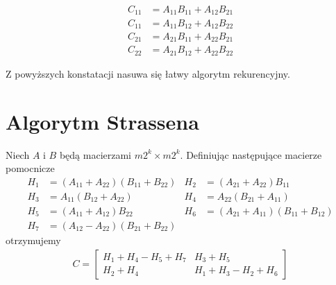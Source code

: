 \begin{equation}
\begin{split}
C_{11} &= A_{11}B_{11} + A_{12}B_{21}\\
C_{11} &= A_{11}B_{12} + A_{12}B_{22}\\
C_{21} &= A_{21}B_{11} + A_{22}B_{21}\\
C_{22} &= A_{21}B_{12} + A_{22}B_{22}
\end{split}
\end{equation}

Z powyższych konstatacji nasuwa się łatwy algorytm rekurencyjny.

\section{Algorytm Strassena}
Niech \(A\) i \(B\) będą macierzami \(m2^k\times m2^k\). Definiując następujące macierze pomocnicze
\begin{align*}
H_1 &= (A_{11}+A_{22})(B_{11}+B_{22})&
 H_2 &= (A_{21}+A_{22})B_{11}\\
H_3 &= A_{11}(B_{12} + A_{22})&
 H_4 &= A_{22}(B_{21} + A_{11})\\
H_5 &= (A_{11}+A_{12})B_{22}&
 H_6 &= (A_{21} + A_{11})(B_{11} + B_{12}) \\
H_7 &= (A_{12}-A_{22})(B_{21}+B_{22}) 
\end{align*}
otrzymujemy
\begin{align}
C = \begin{bmatrix}
H_1+H_4-H_5+H_7& H_3+H_5\\
H_2+H_4& H_1+H_3-H_2+H_6
\end{bmatrix}
\end{align}

